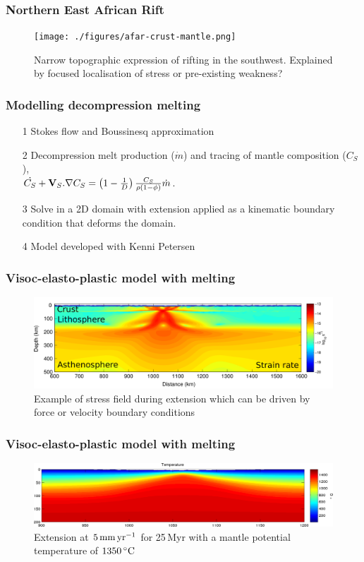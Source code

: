 \documentclass[aspectratio=169]{beamer}
\begin{document}
\begin{frame}
    \frametitle{Northern East African Rift}
    \begin{figure}
        \texttt{[image: ./figures/afar-crust-mantle.png]}
        \caption{Narrow topographic expression of rifting in the southwest. Explained by focused localisation of stress or pre-existing weakness?}
    \end{figure}
\end{frame}

\begin{frame}
    \frametitle{Modelling decompression melting}
    \begin{itemize}
        \item[1]{Stokes flow and Boussinesq approximation}
        \item[2]{Decompression melt production ($\dot{m}$) and tracing of mantle composition ($C_{S}$),\\
                 $\dot{C_{S}} + {\bf V}_{S}.\nabla C_{S} = \left(1 - \frac{1}{D}\right)\frac{C_{S}}{\rho(1-\phi)}\dot{m}$}.
        \item[3]{Solve in a 2D domain with extension applied as a kinematic boundary condition that deforms the domain.}
        \item[4]{Model developed with Kenni Petersen}
    \end{itemize}
\end{frame}

\begin{frame}
    \frametitle{Visoc-elasto-plastic model with melting}
    \begin{figure}
        \includegraphics[width=0.8\paperwidth]{./figures/mess-example.png}
        \caption{Example of stress field during extension which can be driven by force or velocity boundary conditions}
    \end{figure}
\end{frame}

\begin{frame}
    \frametitle{Visoc-elasto-plastic model with melting}
    \begin{figure}
        \includegraphics[width=0.8\paperwidth]{./figures/MESS1.png}
        \caption{Extension at $5\rm\,mm\,yr^{-1}$ for 25\,Myr with a mantle potential temperature of $1350\,^{\circ}\rm C$}
    \end{figure}
\end{frame}
\end{document}
